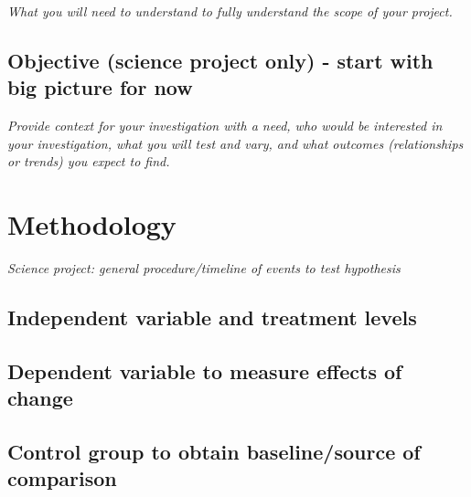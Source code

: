 \emph{What you will need to understand to fully understand the scope of
your project.}

\begin{field}
  
\end{field}

\subsection{Objective (science project only) - start with big picture for now}

\emph{Provide context for your investigation with a need, who would be
  interested in your investigation, what you will test and vary, and what outcomes (relationships or trends) you expect to find.}

\begin{field}

\end{field}

\section{Methodology}

\emph{Science project: general procedure/timeline of events to test hypothesis}

\subsection{Independent variable and treatment levels}

\begin{field}
 
\end{field}

\subsection{Dependent variable to measure effects of change}

\begin{field}

\end{field}


\subsection{Control group to obtain baseline/source of comparison}

\begin{field}

\end{field}


